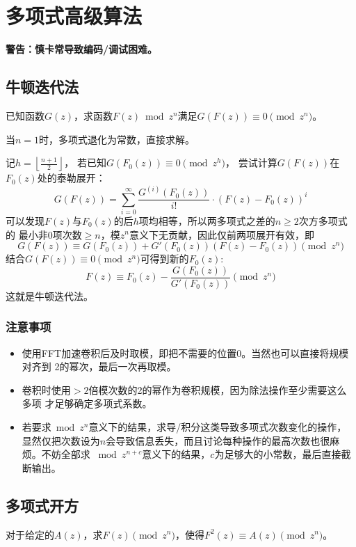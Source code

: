 \section{多项式高级算法}
{\bfseries 警告：慎卡常导致编码/调试困难。}

\subsection{牛顿迭代法}
已知函数$G(z)$，求函数$F(z) \bmod{z^n}$满足$G(F(z))\equiv 0 \pmod{z^n}$。

当$n=1$时，多项式退化为常数，直接求解。

记$h=\left\lfloor\frac{n+1}{2}\right\rfloor$，
若已知$G(F_0(z)) \equiv 0\pmod{z^h}$，
尝试计算$G(F(z))$在$F_0(z)$处的泰勒展开：
\begin{displaymath}
    G(F(z))=\sum_{i=0}^\infty{\frac{G^{(i)}(F_0(z))}{i!}\cdot (F(z)-F_0(z))^i}
\end{displaymath}
可以发现$F(z)$与$F_0(z)$的后$h$项均相等，所以两多项式之差的$n\geq 2$次方多项式的
最小非0项次数$\geq n$，模$z^n$意义下无贡献，因此仅前两项展开有效，即
\begin{displaymath}
    G(F(z))\equiv G(F_0(z))+G'(F_0(z))(F(z)-F_0(z)) \pmod{z^n}
\end{displaymath}
结合$G(F(z))\equiv 0 \pmod{z^n}$可得到新的$F_0(z)$:
\begin{displaymath}
    F(z)\equiv F_0(z)-\frac{G(F_0(z))}{G'(F_0(z))} \pmod{z^n}
\end{displaymath}
这就是牛顿迭代法。

\subsubsection{注意事项}
\begin{itemize}
    \item 使用FFT加速卷积后及时取模，即把不需要的位置0。当然也可以直接将规模对齐到
    2的幂次，最后一次再取模。
    \item 卷积时使用$>2$倍模次数的2的幂作为卷积规模，因为除法操作至少需要这么多项
    才足够确定多项式系数。
    \item 若要求$\bmod{z^n}$意义下的结果，求导/积分这类导致多项式次数变化的操作，
    显然仅把次数设为$n$会导致信息丢失，而且讨论每种操作的最高次数也很麻烦。不妨全部求
    $\bmod{z^{n+c}}$意义下的结果，$c$为足够大的小常数，最后直接截断输出。
\end{itemize}

\subsection{多项式开方}
对于给定的$A(z)$，求$F(z) \pmod{z^n}$，使得$F^2(z)\equiv A(z)\pmod{z^n}$。

